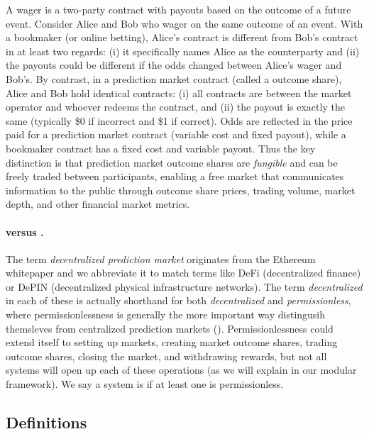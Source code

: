 A wager is a two-party contract with payouts based on the outcome of a future event. Consider Alice and Bob who wager on the same outcome of an event. With a bookmaker (or online betting), Alice's contract is different from Bob's contract in at least two regards: (i) it specifically names Alice as the counterparty and (ii) the payouts could be different if the odds changed between Alice's wager and Bob's. By contrast, in a prediction market contract (called a outcome share), Alice and Bob hold identical contracts: (i) all contracts are between the market operator and whoever redeems the contract, and (ii) the payout is exactly the same (typically \$0 if incorrect and \$1 if correct). Odds are reflected in the price paid for a prediction market contract (\ie variable cost and fixed payout), while a bookmaker contract has a fixed cost and variable payout. Thus the key distinction is that prediction market outcome shares are \textit{fungible} and can be freely traded between participants, enabling a free market that communicates information to the public through outcome share prices, trading volume, market depth, and other financial market metrics. 

\paragraph{\cepm versus \depm.}

The term \textit{decentralized prediction market} originates from the Ethereum whitepaper and we abbreviate it \depm to match terms like DeFi (decentralized finance) or DePIN (decentralized physical infrastructure networks). The term \textit{decentralized} in each of these is actually shorthand for both \textit{decentralized} and \textit{permissionless}, where permissionlessness is generally the more important way \depms distingusih themsleves from centralized prediction markets (\cepms). Permissionlessness could extend itself to setting up markets, creating market outcome shares, trading outcome shares, closing the market, and withdrawing rewards, but not all systems will open up each of these operations (as we will explain in our modular framework). We say a system is \depm if at least one is permissionless.


\subsection{Definitions}

